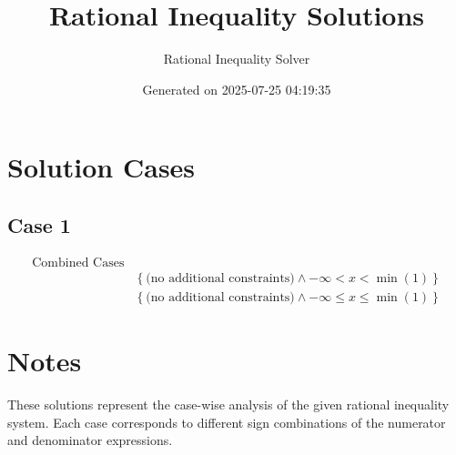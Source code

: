 \documentclass{article}
\title{Rational Inequality Solutions}
\author{Rational Inequality Solver}
\date{Generated on 2025-07-25 04:19:35}
\begin{document}
\maketitle

\section{Solution Cases}

\subsection{Case 1}

\begin{align}
\text{Combined Cases} \\
& \left\{\text{(no additional constraints)} \wedge -\infty < x < \min\left(1\right)\right\} \\
& \left\{\text{(no additional constraints)} \wedge -\infty \le x \le \min\left(1\right)\right\}
\end{align}


\section{Notes}

These solutions represent the case-wise analysis of the given rational inequality system. Each case corresponds to different sign combinations of the numerator and denominator expressions.
\end{document}

